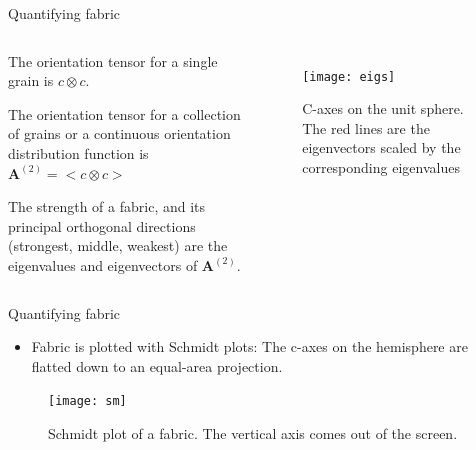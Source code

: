 \documentclass{beamer}
\begin{document}
\begin{frame}{Quantifying fabric}
   \begin{columns}[T]
      \begin{itemize}\small{
      \item The orientation tensor for a single grain is $c \otimes c$.
      \item The orientation tensor for a collection of grains or a continuous orientation distribution function is $\mathbf{A}^{(2)} = < c \otimes c>$
      \item The strength of a fabric, and its principal orthogonal directions (strongest, middle, weakest) are the eigenvalues and eigenvectors of $\mathbf{A}^{(2)}$.
      }
   \end{itemize}
   \begin{figure}
     \texttt{[image: eigs]}
      \caption{\small{C-axes on the unit sphere. The red lines are the eigenvectors scaled by the corresponding eigenvalues}}
   \end{figure}
 \end{columns}
\end{frame}

\begin{frame}{Quantifying fabric}
      \begin{itemize}
      \item Fabric is plotted with Schmidt plots: The c-axes on the hemisphere are flatted down to an equal-area projection.
   \end{itemize}
 
   \begin{figure}
      \texttt{[image: sm]}
      \caption{Schmidt plot of a fabric. The vertical axis comes out of the screen.}
   \end{figure}
\end{frame}
\end{document}
